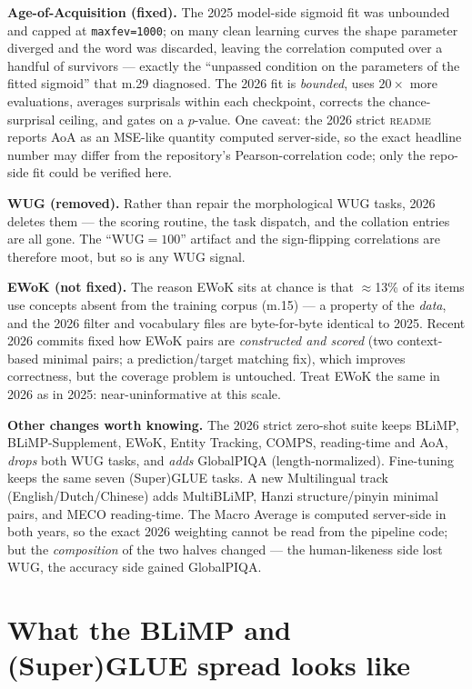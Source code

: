 \documentclass[11pt]{article}
\begin{document}
\textbf{Age-of-Acquisition (fixed).} The 2025 model-side sigmoid fit was unbounded and capped at
\texttt{maxfev=1000}; on many clean learning curves the shape parameter diverged and the word was
discarded, leaving the correlation computed over a handful of survivors --- exactly the ``unpassed
condition on the parameters of the fitted sigmoid'' that m.29 diagnosed. The 2026 fit is \emph{bounded},
uses $20\times$ more evaluations, averages surprisals within each checkpoint, corrects the chance-surprisal
ceiling, and gates on a $p$-value. One caveat: the 2026 strict \textsc{readme} reports AoA as an MSE-like
quantity computed server-side, so the exact headline number may differ from the repository's
Pearson-correlation code; only the repo-side fit could be verified here.

\textbf{WUG (removed).} Rather than repair the morphological WUG tasks, 2026 deletes them --- the scoring
routine, the task dispatch, and the collation entries are all gone. The ``WUG${=}100$'' artifact and the
sign-flipping correlations are therefore moot, but so is any WUG signal.

\textbf{EWoK (not fixed).} The reason EWoK sits at chance is that $\approx$13\% of its items use concepts
absent from the training corpus (m.15) --- a property of the \emph{data}, and the 2026 filter and
vocabulary files are byte-for-byte identical to 2025. Recent 2026 commits fixed how EWoK pairs are
\emph{constructed and scored} (two context-based minimal pairs; a prediction/target matching fix), which
improves correctness, but the coverage problem is untouched. Treat EWoK the same in 2026 as in 2025:
near-uninformative at this scale.

\textbf{Other changes worth knowing.} The 2026 strict zero-shot suite keeps BLiMP, BLiMP-Supplement, EWoK,
Entity Tracking, COMPS, reading-time and AoA, \emph{drops} both WUG tasks, and \emph{adds} GlobalPIQA
(length-normalized). Fine-tuning keeps the same seven (Super)GLUE tasks. A new Multilingual track
(English/Dutch/Chinese) adds MultiBLiMP, Hanzi structure/pinyin minimal pairs, and MECO reading-time.
The Macro Average is computed server-side in both years, so the exact 2026 weighting cannot be read from
the pipeline code; but the \emph{composition} of the two halves changed --- the human-likeness side lost
WUG, the accuracy side gained GlobalPIQA.

\section{What the BLiMP and (Super)GLUE spread looks like}
\label{sec:spread}
\end{document}
